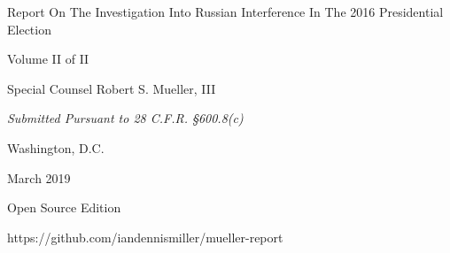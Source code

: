 \thispagestyle{empty}

\begin{center}
\Huge
Report On The Investigation Into Russian Interference In The 2016 Presidential Election

\vspace{10 mm}

\large
Volume II of II

\vspace{10 mm}

Special Counsel Robert S. Mueller, III

\vspace{10 mm}

\normalsize

\textit{Submitted Pursuant to 28 C.F.R. \S 600.8(c)}

\vspace{20 mm}

Washington, D.C.

\vspace{10 mm}

March 2019

\vspace{10 mm}

\large
Open Source Edition

https://github.com/iandennismiller/mueller-report

\end{center}

\newpage
